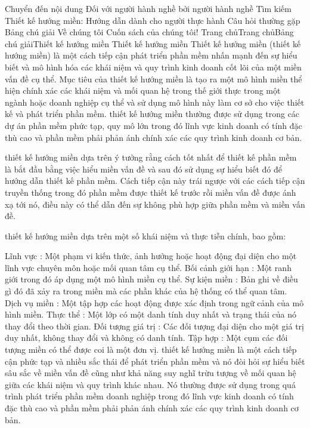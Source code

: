 Chuyển đến nội dung
Đối với người hành nghề bởi người hành nghề
Tìm kiếm
Thiết kế hướng miền: Hướng dẫn dành cho người thực hành
Câu hỏi thường gặp
Bảng chú giải
Về chúng tôi
Cuốn sách của chúng tôi!
Trang chủTrang chủBảng chú giảiThiết kế hướng miền
Thiết kế hướng miền
Thiết kế hướng miền (thiết kế hướng miền) là một cách tiếp cận phát triển phần mềm nhấn mạnh đến sự hiểu biết và mô hình hóa các khái niệm và quy trình kinh doanh cốt lõi của một miền vấn đề cụ thể. Mục tiêu của thiết kế hướng miền là tạo ra một mô hình miền thể hiện chính xác các khái niệm và mối quan hệ trong thế giới thực trong một ngành hoặc doanh nghiệp cụ thể và sử dụng mô hình này làm cơ sở cho việc thiết kế và phát triển phần mềm. thiết kế hướng miền thường được sử dụng trong các dự án phần mềm phức tạp, quy mô lớn trong đó lĩnh vực kinh doanh có tính đặc thù cao và phần mềm phải phản ánh chính xác các quy trình kinh doanh cơ bản.

thiết kế hướng miền dựa trên ý tưởng rằng cách tốt nhất để thiết kế phần mềm là bắt đầu bằng việc hiểu miền vấn đề và sau đó sử dụng sự hiểu biết đó để hướng dẫn thiết kế phần mềm. Cách tiếp cận này trái ngược với các cách tiếp cận truyền thống trong đó phần mềm được thiết kế trước rồi miền vấn đề được ánh xạ tới nó, điều này có thể dẫn đến sự không phù hợp giữa phần mềm và miền vấn đề.

thiết kế hướng miền dựa trên một số khái niệm và thực tiễn chính, bao gồm:

Lĩnh vực : Một phạm vi kiến ​​thức, ảnh hưởng hoặc hoạt động đại diện cho một lĩnh vực chuyên môn hoặc mối quan tâm cụ thể.
Bối cảnh giới hạn : Một ranh giới trong đó áp dụng một mô hình miền cụ thể.
Sự kiện miền : Bản ghi về điều gì đó đã xảy ra trong miền mà các phần khác của hệ thống có thể quan tâm.
Dịch vụ miền : Một tập hợp các hoạt động được xác định trong ngữ cảnh của mô hình miền.
Thực thể : Một lớp có một danh tính duy nhất và trạng thái của nó thay đổi theo thời gian.
Đối tượng giá trị : Các đối tượng đại diện cho một giá trị duy nhất, không thay đổi và không có danh tính.
Tập hợp : Một cụm các đối tượng miền có thể được coi là một đơn vị.
thiết kế hướng miền là một cách tiếp cận phức tạp và nhiều sắc thái để phát triển phần mềm và nó đòi hỏi sự hiểu biết sâu sắc về miền vấn đề cũng như khả năng suy nghĩ trừu tượng về mối quan hệ giữa các khái niệm và quy trình khác nhau. Nó thường được sử dụng trong quá trình phát triển phần mềm doanh nghiệp trong đó lĩnh vực kinh doanh có tính đặc thù cao và phần mềm phải phản ánh chính xác các quy trình kinh doanh cơ bản.

